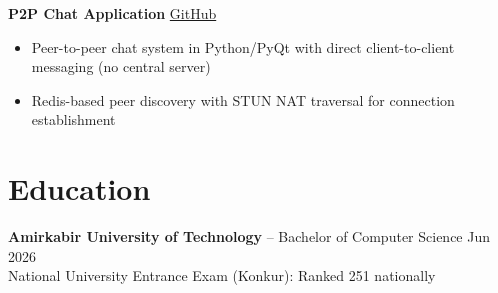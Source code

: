 \documentclass[11pt]{article}       %
\begin{document}
\vspace{4pt}

\textbf{P2P Chat Application} \hfill \href{https://github.com/vandad1901/P2P-chat}{GitHub} \\
\vspace{-9pt}
\begin{itemize}
  \item Peer-to-peer chat system in Python/PyQt with direct client-to-client messaging (no central server)
  \item Redis-based peer discovery with STUN NAT traversal for connection establishment
\end{itemize}


\vspace{-18.5pt}

\section*{Education}
\textbf{Amirkabir University of Technology} -- Bachelor of Computer Science \hfill Jun 2026 \\
National University Entrance Exam (Konkur): Ranked 251 nationally
\end{document}
